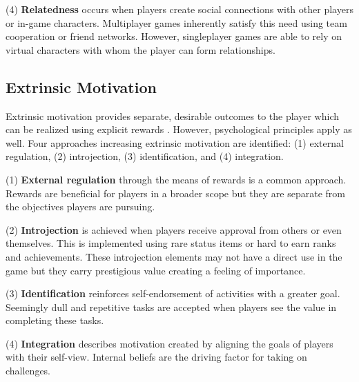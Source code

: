 (4) \textbf{Relatedness} occurs when players create social connections with other players or in-game characters.
Multiplayer games inherently satisfy this need using team cooperation or friend networks.
However, singleplayer games are able to rely on virtual characters with whom the player can form relationships.

\subsection{Extrinsic Motivation}
Extrinsic motivation provides separate, desirable outcomes to the player which can be realized using explicit rewards \cite{Birk2016}.
However, psychological principles apply as well.
Four approaches increasing extrinsic motivation are identified: (1) external regulation, (2) introjection, (3) identification, and (4) integration.

(1) \textbf{External regulation} through the means of rewards is a common approach.
Rewards are beneficial for players in a broader scope but they are separate from the objectives players are pursuing.

(2) \textbf{Introjection} is achieved when players receive approval from others or even themselves.
This is implemented using rare status items or hard to earn ranks and achievements.
These introjection elements may not have a direct use in the game but they carry prestigious value creating a feeling of importance.

(3) \textbf{Identification} reinforces self-endorsement of activities with a greater goal.
Seemingly dull and repetitive tasks are accepted when players see the value in completing these tasks.

(4) \textbf{Integration} describes motivation created by aligning the goals of players with their self-view.
Internal beliefs are the driving factor for taking on challenges.

